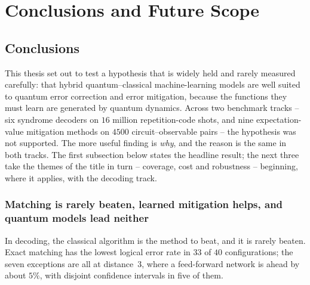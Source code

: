 \documentclass[Thesis.tex]{subfiles}
\begin{document}
\newpage
\setcounter{chapter}{6} %


\thispagestyle{empty}

\chapter{Conclusions and Future Scope}\label{chap7:conclusion}

\section{Conclusions}

This thesis set out to test a hypothesis that is widely held and rarely measured
carefully: that hybrid quantum--classical machine-learning models are well suited to
quantum error correction and error mitigation, because the functions they must learn
are generated by quantum dynamics. Across two benchmark tracks -- six syndrome
decoders on $16$ million repetition-code shots, and nine expectation-value
mitigation methods on $4500$ circuit--observable pairs -- the hypothesis was not
supported. The more useful finding is \emph{why}, and the reason is the same in both
tracks. The first subsection below states the headline result; the next three take
the themes of the title in turn -- coverage, cost and robustness -- beginning, where
it applies, with the decoding track.

\subsection{Matching is rarely beaten, learned mitigation helps, and quantum models lead neither}

In decoding, the classical algorithm is the method to beat, and it is rarely beaten.
Exact matching has the lowest logical error rate in $33$ of $40$ configurations; the
seven exceptions are all at distance~$3$, where a feed-forward network is ahead by
about $5\%$, with disjoint confidence intervals in five of them.
\end{document}
